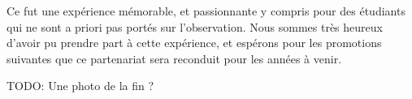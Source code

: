 \documentclass[a4paper,10pt,french]{article}
\begin{document}
Ce fut une expérience mémorable, et passionnante y compris pour des étudiants
qui ne sont a priori pas portés sur l’observation. Nous sommes très heureux
d’avoir pu prendre part à cette expérience, et espérons pour les promotions
suivantes que ce partenariat sera reconduit pour les années à venir.

TODO: Une photo de la fin ?
\end{document}
